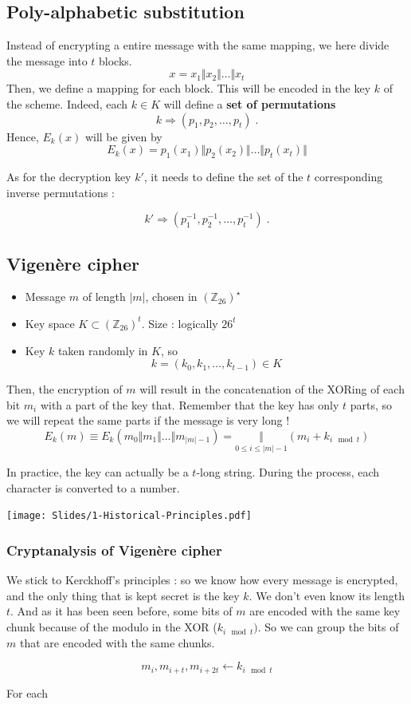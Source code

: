 \documentclass[a4paper, 12pt]{book}
\begin{document}
\subsection{Poly-alphabetic substitution}
Instead of encrypting a entire message with the same mapping, we here divide the message into $t$ blocks.
$$ x = x_1 \Vert x_2 \Vert \dots \Vert x_t$$
Then, we define a mapping for each block. This will be encoded in the key $k$ of the scheme. Indeed, each $k\in K$ will define a \textbf{set of permutations} 
$$k \Rightarrow (p_1, p_2, \dots, p_t) \; .$$
Hence, $E_k(x)$ will be given by 
$$E_k(x) = p_1(x_1) \Vert p_2(x_2) \Vert \dots \Vert p_t(x_t) \Vert $$

As for the decryption key $k'$, it needs to define the set of the $t$ corresponding inverse permutations :

$$k' \Rightarrow (p_1^{-1}, p_2^{-1}, \dots, p_t^{-1}) \; .$$

\subsection{Vigenère cipher} 
\begin{itemize}
    \item Message $m$ of length $|m|$, chosen in $(\mathbb{Z}_{26})^\star$
    \item Key space $K \subset (\mathbb{Z}_{26})^t$. Size : logically $26^t$
    \item Key $k$ taken randomly in $K$, so 
    $$k = (k_0, k_1, \dots, k_{t-1}) \in K$$
\end{itemize}
Then, the encryption of $m$ will result in the concatenation of the XORing of each bit $m_i$ with a part of the key that. Remember that the key has only $t$ parts, so we will repeat the same parts if the message is very long !
$$E_k(m) \equiv E_k(m_0 \Vert m_1 \Vert \dots \Vert m_{|m|-1}) =  \underset{\scriptscriptstyle{0\leq i \leq |m|-1}}{\Vert} (m_i + k_{i  \mod{t}})$$

In practice, the key can actually be a $t$-long string. During the process, each character is converted to a number.

\begin{center}
    \texttt{[image: Slides/1-Historical-Principles.pdf]}
\end{center}

\subsubsection{Cryptanalysis of Vigenère cipher}
We stick to Kerckhoff's principles : so we know how every message is encrypted, and the only thing that is kept secret is the key $k$. We don't even know its length $t$. And as it has been seen before, some bits of $m$ are encoded with the same key chunk because of the modulo in the XOR ($k_{i\mod t})$. So we can group the bits of $m$ that are encoded with the same chunks.

$$m_i, m_{i+ t}, m_{i+2t} \longleftarrow k_{i\mod t}$$

For each 
\end{document}
